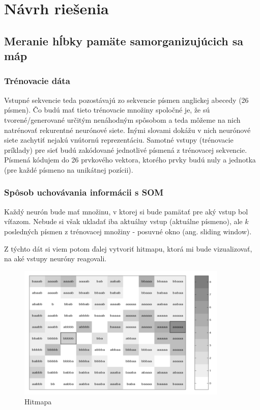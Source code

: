 \chapter{Návrh riešenia}

\section{Meranie hĺbky pamäte samorganizujúcich sa máp}

\subsection{Trénovacie dáta}
Vstupné sekvencie teda pozostávajú zo sekvencie písmen anglickej abecedy (26 písmen).
Čo budú mať tieto trénovacie množiny spoločné je, že sú tvorené/generované určitým nenáhodným spôsobom 
a teda môžeme na nich natrénovať rekurentné neurónové siete. Inými slovami dokážu v nich 
neurónové siete zachytiť nejakú vnútornú reprezentáciu.
Samotné vstupy (trénovacie príklady) pre sieť budú zakódované jednotlivé písmená z trénovacej sekvencie.
Písmená kódujem do 26 prvkového vektora, ktorého prvky budú nuly a jednotka (pre každé písmeno na unikátnej pozícii).

\subsection{Spôsob uchovávania informácii s SOM}
Každý neurón bude mať množinu, v ktorej si bude pamätať pre aký vstup bol víťazom. 
Nebude si však ukladať iba aktuálny vstup (aktuálne písmeno), 
ale $k$ posledných písmen z trénovacej množiny - posuvné okno (ang. sliding window). 

Z týchto dát si viem potom ďalej vytvoriť hitmapu, ktorá mi bude vizualizovať, na aké vstupy neuróny reagovali.

\begin{figure}[H]
	\centering
	\includegraphics[width=10cm]{assets/receptive_field}
	\caption{Hitmapa}
\end{figure}

